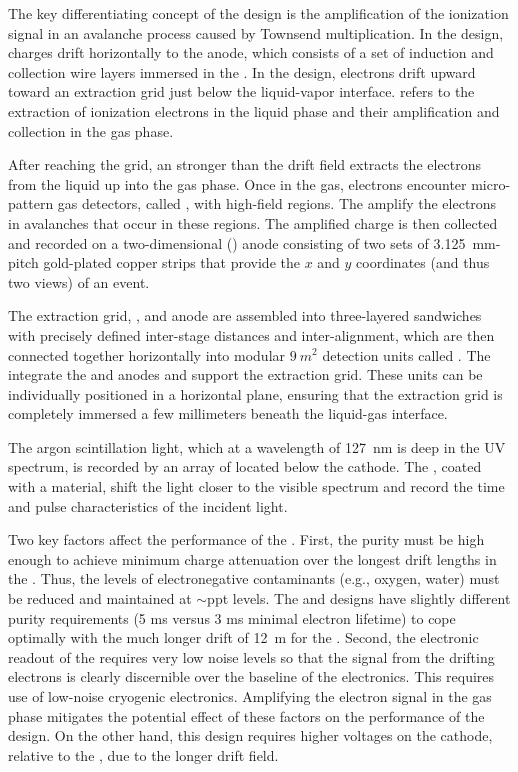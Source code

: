 The key differentiating concept of the  design is the amplification of the ionization signal in an avalanche process caused by Townsend multiplication. In the  design, charges drift horizontally to the anode, which consists of a set of induction and collection wire layers immersed in the . In the  design, electrons drift upward toward an extraction grid just below the liquid-vapor interface.  refers to the extraction of ionization electrons in the liquid phase and their amplification and collection in the gas phase.

After reaching the grid, an \efield stronger than the drift field extracts the electrons from the liquid up into the gas phase. Once in the gas, electrons encounter micro-pattern gas detectors, called , with high-field regions. The  amplify the electrons in avalanches that occur in these regions. The amplified charge is then collected and recorded on a two-dimensional (\twod) anode consisting of two sets of \SI{3.125}{mm}-pitch gold-plated copper strips that provide the $x$ and $y$ coordinates (and thus two views) of an event. 

The extraction grid, , and anode are assembled into three-layered sandwiches with precisely defined inter-stage distances and inter-alignment,  which are then connected together horizontally into modular $\SI{9}{m^2}$ detection units called . The  integrate the  and anodes and support the extraction grid. These units can be individually positioned in a horizontal plane, ensuring that the extraction grid is completely immersed a few millimeters beneath the liquid-gas interface. 

The argon scintillation light, which at a wavelength of  \SI{127}{nm} is deep in the UV spectrum,   is recorded by an array of  located below the cathode.  The , coated with a  material, shift the light  closer to the visible spectrum and record the time and pulse characteristics of the incident light.

Two key factors affect the performance of the .  First, the  purity must be high enough to achieve minimum charge attenuation over the longest drift lengths in the .  Thus, the levels of electronegative contaminants (e.g., oxygen, water) must be reduced and
maintained at $\sim$ppt levels.  The  and  designs have slightly different purity requirements (5 ms versus 3 ms minimal electron lifetime) to  cope optimally with the much longer drift of \SI{12}{m} for the . 
Second, the electronic readout of the  requires very low noise levels so that the signal from the drifting electrons is clearly discernible over the baseline of the electronics.  This requires use of low-noise cryogenic electronics.  
Amplifying the electron signal in the gas phase mitigates the potential effect of these factors on the performance of the  design.  On the other hand, this design requires  higher voltages on the cathode, relative to the , due to the longer drift field. 

